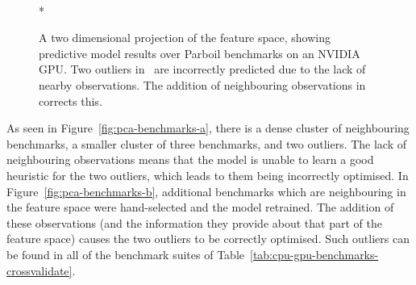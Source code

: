 \begin{figure}
	\centering
  \\*
	\caption[Identifying and correcting outliers in a benchmark suite]{%
    A two dimensional projection of the \citeauthor{Grewe2013} feature space, showing predictive model results over Parboil benchmarks on an NVIDIA GPU. Two outliers in~\protect{} are incorrectly predicted due to the lack of nearby observations. The addition of neighbouring observations in~\protect{} corrects this.%
  }%
	\label{fig:pca-benchmarks}
\end{figure}

As seen in Figure~\ref{fig:pca-benchmarks-a}, there is a dense cluster of neighbouring benchmarks, a smaller cluster of three benchmarks, and two outliers. The lack of neighbouring observations means that the model is unable to learn a good heuristic for the two outliers, which leads to them being incorrectly optimised. In Figure~\ref{fig:pca-benchmarks-b}, additional benchmarks which are neighbouring in the feature space were hand-selected and the model retrained. The addition of these observations (and the information they provide about that part of the feature space) causes the two outliers to be correctly optimised. Such outliers can be found in all of the benchmark suites of Table~\ref{tab:cpu-gpu-benchmarks-crossvalidate}.

